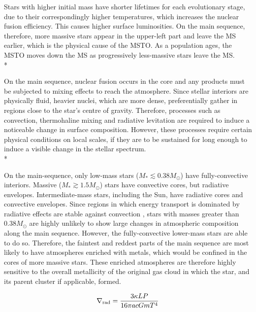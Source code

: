 \documentclass[12pt, a4paper]{report}
\begin{document}
Stars with higher initial mass have shorter lifetimes for each evolutionary stage, due to their correspondingly higher temperatures, which increases the nuclear fusion efficiency. This causes higher surface luminosities. On the main sequence, therefore, more massive stars appear in the upper-left part and leave the MS earlier, which is the physical cause of the MSTO. As a population ages, the MSTO moves down the MS as progressively less-massive stars leave the MS. \\*

On the main sequence, nuclear fusion occurs in the core and any products must be subjected to mixing effects to reach the atmosphere. Since stellar interiors are physically fluid, heavier nuclei, which are more dense, preferentially gather in regions close to the star's centre of gravity. Therefore, processes such as convection, thermohaline mixing and radiative levitation are required to induce a noticeable change in surface composition. However, these processes require certain physical conditions on local scales, if they are to be sustained for long enough to induce a visible change in the stellar spectrum. \\*

On the main-sequence, only low-mass stars ($M_{*} \lesssim 0.38M_{\odot}$) \citep{2018A&A...619A.177B} have fully-convective interiors. Massive ($M_{*} \gtrsim 1.5M_{\odot}$) stars have convective cores, but radiative envelopes. Intermediate-mass stars, including the Sun, have radiative cores and convective envelopes. Since regions in which energy transport is dominated by radiative effects are stable against convection \citep{2017RSOS....470192S}, stars with masses greater than $0.38M_{\odot}$ are highly unlikely to show large changes in atmospheric composition along the main sequence. However, the fully-convective lower-mass stars are able to do so. Therefore, the faintest and reddest parts of the main sequence are most likely to have atmospheres enriched with metals, which would be confined in the cores of more massive stars. These enriched atmospheres are therefore highly sensitive to the overall metallicity of the original gas cloud in which the star, and its parent cluster if applicable, formed.

\begin{equation}
\nabla_{\textnormal{rad}} = \frac{3\kappa LP}{16\pi acGmT^{4}}
\end{equation}
\end{document}
